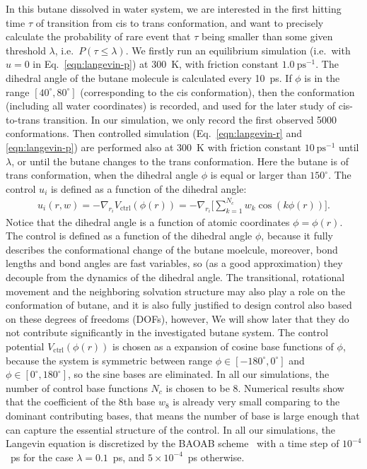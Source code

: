 \documentclass[final]{siamltex}
\begin{document}
In this butane dissolved in water system, we are interested in the
first hitting time $\tau$ of transition from cis to trans
conformation, and want to precisely calculate the probability of rare
event that $\tau$ being smaller than some given threshold $\lambda$,
i.e.~$P(\tau \leq\lambda)$. We firstly run an equilibrium simulation
(i.e.~with $u = 0$ in Eq.~\eqref{eqn:langevin-p}) at 300~K, with
friction constant $1.0~\textrm{ps}^{-1}$.  The dihedral angle of the
butane molecule is calculated every 10~ps. If $\phi$ is in the range
$[40^\circ, 80^\circ]$ (corresponding to the cis conformation), then
the conformation (including all water coordinates) is recorded, and
used for the later study of cis-to-trans transition. In our
simulation, we only record the first observed 5000 conformations.
Then controlled simulation (Eq.~\eqref{eqn:langevin-r} and
\eqref{eqn:langevin-p}) are performed also at 300~K with friction
constant $10~\textrm{ps}^{-1}$ until $\lambda$, or until the butane
changes to the trans conformation. Here the butane is of trans
conformation, when the dihedral angle $\phi$ is equal or larger than
$150^\circ$. The control  $u_i$ is defined as a function of
the dihedral angle:
\begin{align}
  u_i(r, w) = -\nabla_{r_i}V_{\textrm{ctrl}}(\phi(r))=
  -\nabla_{r_i} \bigg[ \sum_{k=1}^{N_c} w_k\cos(k \phi (r)) \bigg].
\end{align}
Notice that the dihedral angle is a function of atomic coordinates
$\phi = \phi(r)$.  The control is defined as a function of the
dihedral angle $\phi$, because it fully describes the conformational
change of the butane moelcule, moreover, bond lengths and bond angles
are fast variables, so (as a good approximation) they decouple from
the dynamics of the dihedral angle.  The transitional, rotational
movement and the neighboring solvation structure may also play a role
on the conformation of butane, and it is also fully justified to
design control also based on these degrees of freedoms (DOFs), however, We
will show later that they do not contribute significantly in the
investigated butane system.  The control potential
$V_{\textrm{ctrl}}(\phi(r))$ is chosen as a expansion of cosine base
functions of $\phi$, because the system is symmetric between range $\phi \in
[-180^\circ,0^\circ]$ and $\phi \in [0^\circ, 180^\circ]$, so the sine
bases are eliminated. In all our simulations, the number of control
base functions $N_c$ is chosen to be 8. Numerical results show that
the coefficient of the 8th base $w_8$ is already very small comparing
to the dominant contributing bases, that means the number of base is
large enough that can capture the essential structure of the control.
In all our simulations, the Langevin equation is discretized by the
BAOAB scheme~\cite{leimkuhler2013rational} with a time step of
$10^{-4}$~ps for the case $\lambda = 0.1$~ps, and $5\times10^{-4}$~ps
otherwise.
\end{document}
